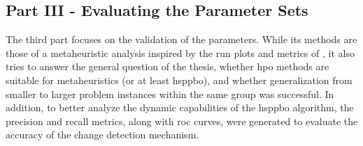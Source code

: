 \subsection{Part III - Evaluating the Parameter Sets}

The third part focuses on the validation of the parameters. While its methods are those of a metaheuristic analysis inspired by the run plots and metrics of \cite{kupfer2021hierarchical}, it also tries to answer the  general question of the thesis, whether \gls{hpo} methods are suitable for metaheuristics (or at least \gls{hsppbo}), and whether generalization from smaller to larger problem instances within the same group was successful. In addition, to better analyze the dynamic capabilities of the \gls{hsppbo} algorithm, the precision and recall metrics, along with \gls{roc} curves, were generated to evaluate the accuracy of the change detection mechanism.
